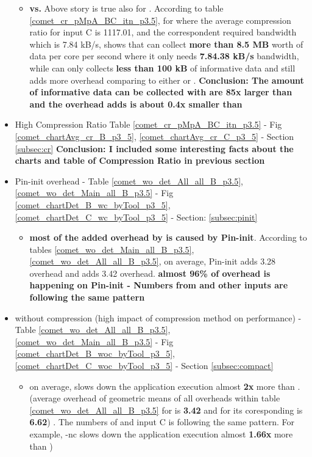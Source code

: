 \begin{itemize}
\begin{itemize}
	\item \textsf{\textbf{\parlotm vs. \callgrind} Above story is true also for \parlotm. According to table \ref{comet_cr_pMpA_BC_itn_p3.5}, for \parlotm where the average compression ratio for input C is 1117.01, and the correspondent required bandwidth which is 7.84 kB/s, shows that \parlotm can collect \textbf{more than 8.5 MB} worth of data per core per second where it only needs \textbf{7.84.38 kB/s} bandwidth, while \callgrind can only collects \textbf{less than 100 kB} of informative data and still adds more overhead comparing to either \parlota or \parlotm. \textbf{Conclusion: The amount of informative data can be collected with \parlotm  are 85x larger than \callgrind and the overhead \parlotm adds is about 0.4x smaller than \callgrind}}
	\end{itemize}
	
	
\item \textsf{High Compression Ratio Table \ref{comet_cr_pMpA_BC_itn_p3.5} - Fig \ref{comet_chartAvg_cr_B_p3_5}, \ref{comet_chartAvg_cr_C_p3_5} - Section \ref{subsec:cr}
\textbf{Conclusion: I included some interesting facts about the charts and table of Compression Ratio in previous section}}
\item \textsf{ Pin-init overhead - Table \ref{comet_wo_det_All_all_B_p3.5}, \ref{comet_wo_det_Main_all_B_p3.5} - Fig \ref{comet_chartDet_B_wc_byTool_p3_5}, \ref{comet_chartDet_C_wc_byTool_p3_5} - Section: \ref{subsec:pinit}}
	\begin{itemize}
	\item \textsf{\textbf{most of the added overhead by \parlot is caused by Pin-init}. According to tables \ref{comet_wo_det_Main_all_B_p3.5}, \ref{comet_wo_det_All_all_B_p3.5}, on average, Pin-init adds 3.28 overhead and \parlota adds 3.42 overhead. \textbf{almost 96\% of \parlota overhead is happening on Pin-init - Numbers from \parlotm and other inputs are following the same pattern}}
	\end{itemize}
\item \textsf{ \parlot without compression  (high impact of compression method on performance) - Table \ref{comet_wo_det_All_all_B_p3.5}, \ref{comet_wo_det_Main_all_B_p3.5}  - Fig \ref{comet_chartDet_B_woc_byTool_p3_5}, \ref{comet_chartDet_C_woc_byTool_p3_5} - Section \ref{subsec:compact}}

\begin{itemize}
\item \textsf{on average, \parlotnc slows down the application execution almost \textbf{2x} more than \parlota. (average overhead of geometric means of all overheads within table  \ref{comet_wo_det_All_all_B_p3.5} for \parlota is \textbf{3.42} and for its coresponding \parlotnc is \textbf{6.62}) . The numbers of \parlotm and input C is following the same pattern. For example, \parlot-nc slows down the application execution almost \textbf{1.66x} more than \parlotm)}
\end{itemize}
\end{itemize}

\vspace{1ex}

\vspace{1ex}
\vspace{1ex}


